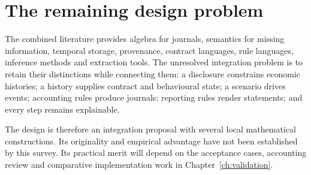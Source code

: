 \section{The remaining design problem}

The combined literature provides algebra for journals, semantics for missing
information, temporal storage, provenance, contract languages, rule languages,
inference methods and extraction tools. The unresolved integration problem is
to retain their distinctions while connecting them: a disclosure constrains
economic histories; a history supplies contract and behavioural state; a
scenario drives events; accounting rules produce journals; reporting rules
render statements; and every step remains explainable.

The design is therefore an integration proposal with several local
mathematical constructions. Its originality and empirical advantage have not
been established by this survey. Its practical merit will depend on the
acceptance cases, accounting review and comparative implementation work in
Chapter~\ref{ch:validation}.

